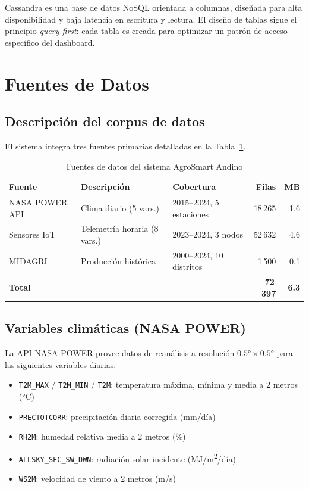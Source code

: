 \documentclass[12pt,a4paper]{article}
\begin{document}
Cassandra es una base de datos NoSQL orientada a columnas, diseñada para
alta disponibilidad y baja latencia en escritura y lectura. El diseño de
tablas sigue el principio \textit{query-first}: cada tabla es creada para
optimizar un patrón de acceso específico del dashboard.

\section{Fuentes de Datos}

\subsection{Descripción del corpus de datos}

El sistema integra tres fuentes primarias detalladas en la
Tabla~\ref{tab:fuentes}.

\begin{table}[H]
\centering
\caption{Fuentes de datos del sistema AgroSmart Andino}
\label{tab:fuentes}
\begin{tabular}{p{3cm}p{3.5cm}p{3cm}rr}
\toprule
\textbf{Fuente} & \textbf{Descripción} & \textbf{Cobertura} &
\textbf{Filas} & \textbf{MB} \\
\midrule
NASA POWER API & Clima diario (5 vars.) & 2015--2024, 5 estaciones &
18\,265 & 1.6 \\
Sensores IoT   & Telemetría horaria (8 vars.) & 2023--2024, 3 nodos &
52\,632 & 4.6 \\
MIDAGRI        & Producción histórica & 2000--2024, 10 distritos &
1\,500 & 0.1 \\
\midrule
\textbf{Total} & & & \textbf{72\,397} & \textbf{6.3} \\
\bottomrule
\end{tabular}
\end{table}

\subsection{Variables climáticas (NASA POWER)}

La API NASA POWER provee datos de reanálisis a resolución $0.5°\times0.5°$
para las siguientes variables diarias:

\begin{itemize}[noitemsep]
  \item \texttt{T2M\_MAX} / \texttt{T2M\_MIN} / \texttt{T2M}: temperatura
    máxima, mínima y media a 2 metros (°C)
  \item \texttt{PRECTOTCORR}: precipitación diaria corregida (mm/día)
  \item \texttt{RH2M}: humedad relativa media a 2 metros (\%)
  \item \texttt{ALLSKY\_SFC\_SW\_DWN}: radiación solar incidente
    (MJ/m\textsuperscript{2}/día)
  \item \texttt{WS2M}: velocidad de viento a 2 metros (m/s)
\end{itemize}
\end{document}
